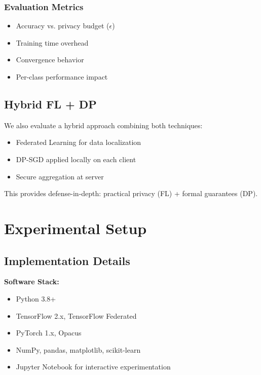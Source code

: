 \documentclass[conference]{IEEEtran}
\begin{document}
\subsubsection{Evaluation Metrics}

\begin{itemize}
    \item Accuracy vs. privacy budget ($\epsilon$)
    \item Training time overhead
    \item Convergence behavior
    \item Per-class performance impact
\end{itemize}

\subsection{Hybrid FL + DP}

We also evaluate a hybrid approach combining both techniques:

\begin{itemize}
    \item Federated Learning for data localization
    \item DP-SGD applied locally on each client
    \item Secure aggregation at server
\end{itemize}

This provides defense-in-depth: practical privacy (FL) + formal guarantees (DP).

\section{Experimental Setup}
\label{sec:experimental_setup}

\subsection{Implementation Details}

\textbf{Software Stack:}
\begin{itemize}
    \item Python 3.8+
    \item TensorFlow 2.x, TensorFlow Federated
    \item PyTorch 1.x, Opacus
    \item NumPy, pandas, matplotlib, scikit-learn
    \item Jupyter Notebook for interactive experimentation
\end{itemize}
\end{document}

